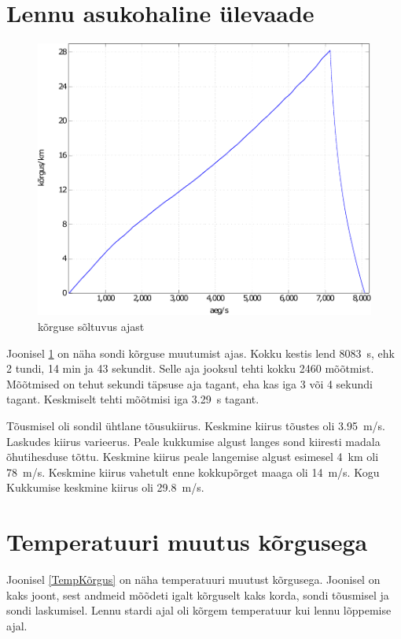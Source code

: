 \documentclass{trkut}%
\begin{document}
\section{Lennu asukohaline ülevaade}

\begin{figure}[h]
	\includegraphics[width=1\textwidth]{PicGra/kõraeg.pdf}
	\caption{kõrguse sõltuvus ajast}
	\label{kõraeg}
\end{figure}

Joonisel \ref{kõraeg} on näha sondi kõrguse muutumist ajas. Kokku kestis lend \SI{8083}{s}, ehk 2 tundi, 14 min ja 43 sekundit. Selle aja jooksul tehti kokku 2460 mõõtmist. Mõõtmised on tehut sekundi täpsuse aja tagant, eha kas iga 3 või 4 sekundi tagant. Keskmiselt tehti mõõtmisi iga \SI{3.29}{s} tagant.

Tõusmisel oli sondil ühtlane tõusukiirus. Keskmine kiirus tõustes oli \SI{3.95}{m/s}. Laskudes kiirus varieerus. Peale kukkumise algust langes sond kiiresti madala õhutihesduse tõttu. Keskmine kiirus peale langemise algust esimesel \SI{4}{km} oli \SI{78}{m/s}. Keskmine kiirus vahetult enne kokkupõrget maaga oli \SI{14}{m/s}. Kogu Kukkumise keskmine kiirus oli \SI{29.8}{m/s}.

\section{Temperatuuri muutus kõrgusega}
Joonisel \ref{TempKõrgus} on näha temperatuuri muutust kõrgusega. Joonisel on kaks joont, sest andmeid mõõdeti igalt kõrguselt kaks korda, sondi tõusmisel ja sondi laskumisel. Lennu stardi ajal oli kõrgem temperatuur kui lennu lõppemise ajal.
\end{document}

